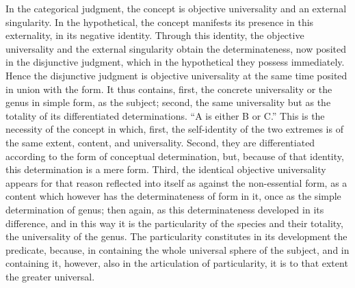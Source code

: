 In the categorical judgment, the concept is
objective universality and an external singularity.
In the hypothetical, the concept manifests its presence
in this externality, in its negative identity.
Through this identity, the objective universality
and the external singularity obtain the determinateness,
now posited in the disjunctive judgment,
which in the hypothetical they possess immediately.
Hence the disjunctive judgment is objective universality
at the same time posited in union with the form.
It thus contains,
first, the concrete universality
or the genus in simple form, as the subject;
second, the same universality
but as the totality of its differentiated determinations.
“A is either B or C.”
This is the necessity of the concept in which,
first, the self-identity of the two extremes is
of the same extent, content, and universality.
Second, they are differentiated according
to the form of conceptual determination,
but, because of that identity,
this determination is a mere form.
Third, the identical objective universality appears
for that reason reflected into itself
as against the non-essential form,
as a content which however has the determinateness of form in it,
once as the simple determination of genus;
then again, as this determinateness developed in its difference,
and in this way it is the particularity of the species
and their totality, the universality of the genus.
The particularity constitutes in its development the predicate,
because, in containing the whole universal
sphere of the subject, and in containing it,
however, also in the articulation of particularity,
it is to that extent the greater universal.

